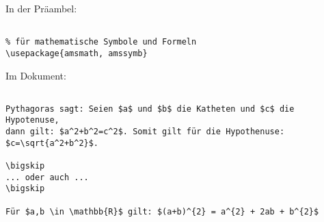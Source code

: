 
In der Präambel:

\begin{verbatim}

% für mathematische Symbole und Formeln
\usepackage{amsmath, amssymb}

\end{verbatim}

\tcblower

Im Dokument: 

\begin{verbatim}

Pythagoras sagt: Seien $a$ und $b$ die Katheten und $c$ die Hypotenuse, 
dann gilt: $a^2+b^2=c^2$. Somit gilt für die Hypothenuse: $c=\sqrt{a^2+b^2}$.

\bigskip  
... oder auch ...
\bigskip  

Für $a,b \in \mathbb{R}$ gilt: $(a+b)^{2} = a^{2} + 2ab + b^{2}$

\end{verbatim}
